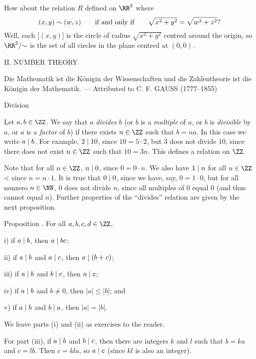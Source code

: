 How about the relation $R$ defined on $\RR^2$ where
$$(x,y)\sim (w,z) \qquad\hbox{if and only if}\qquad \sqrt{x^2+y^2} = \sqrt{w^2 + z^2}?$$
Well, each $\bigl[(x,y)\bigr]$ is the circle of radius $\sqrt{x^2 + y^2}$ centred
around the origin, so $\RR^2/{\sim}$ is the set of all circles in the plane centred at $(0,0)$.


\vfill\eject
\begingroup\headline{\hfil}\footline{\hfil}
\centerline{\titlefont II. NUMBER THEORY}
\vskip220pt
\bigskip
\begingroup\obeylines\eightssi
\hfill Die Mathematik ist die K\"onigin der Wissenschaften
\hfill und die Zahlentheorie ist die K\"onigin der Mathematik.
\eightss
\smallskip
\hfill --- {\eightssi Attributed to} C. F. GAUSS {\eightssi (1777--1855)}
\endgroup%
\bigskip\goodbreak
\vfill\eject

\advsect Division

Let $a,b\in \ZZ$. We say that $a$ {\it divides} $b$ (or $b$ is a {\it multiple} of $a$, or $b$ is {\it divisible}
by $a$, or $a$ is a {\it factor} of $b$) if there exists $n\in \ZZ$ such that $b=na$. In this
case we write $a\mid b$. For example, $2\mid 10$, since $10 = 5\cdot 2$, but
$3$ does not divide $10$, since there does not exist $n\in \ZZ$ such that $10 = 3n$.
This defines a relation on $\ZZ$.

Note that for all $n\in \ZZ$, $n\mid 0$, since $0 = 0\cdot n$. We also have
$1\mid n$ for all $n\in \ZZ$< since $n = n\cdot 1$. It is true that $0\mid 0$, since we
have, say, $0 = 1\cdot 0$, but for all nonzero $n\in \NN$, $0$ does not divide $n$, since all multiples
of $0$ equal $0$ (and thus cannot equal $n$). Further properties of the ``divides'' relation
are given by the next proposition.

\proclaim Proposition \advthm. For all $a,b,c,d\in \ZZ$,
\medskip
\item{i)} if $a\mid b$, then $a\mid bc$;
\smallskip
\item{ii)} if $a\mid b$ and $a\mid c$, then $a\mid (b+c)$;
\smallskip
\item{iii)} if $a\mid b$ and $b\mid c$, then $a\mid c$;
\smallskip
\item{iv)} if $a\mid b$ and $b\ne 0$, then $|a|\le |b|$; and
\smallskip
\item{v)} if $a\mid b$ and $b\mid a$, then $|a| = |b|$.
\medskip

\proof We leave parts (i) and (ii) as exercises to the reader.

For part (iii), if $a\mid b$ and $b\mid c$,
then there are integers $k$ and $l$ such that $b = ka$ and $c = lb$. Then $c = kla$, so $a\mid c$
(since $kl$ is also an integer).

